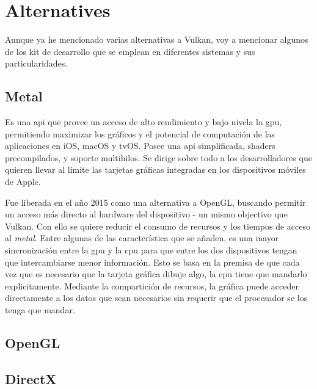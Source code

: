 \chapter{Alternatives}
Aunque ya he mencionado varias alternativas a Vulkan, voy a mencionar algunos de los kit de desarrollo que se emplean
en diferentes sistemas y sus particularidades.

\section{Metal}
Es una \gls{api} que provee un acceso de alto rendimiento y bajo nivela la \gls{gpu}, permitiendo maximizar los
gráficos y el potencial de computación de las aplicaciones en iOS, macOS y tvOS. Posee una \gls{api} simplificada,
shaders precompilados, y soporte multihilos. Se dirige sobre todo a los desarrolladores que quieren llevar al límite
las tarjetas gráficas integradas en los dispositivos móviles de Apple.

Fue liberada en el año 2015 como una alternativa a OpenGL, buscando permitir un acceso más directo al hardware del
dispositivo - un mismo objectivo que Vulkan. Con ello se quiere reducir el consumo de recursos y los tiempos de
acceso al \emph{metal}. Entre algunas de las característica que se añaden, es una mayor sincronización entre la
\gls{gpu} y la \gls{cpu} para que entre los dos dispositivos tengan que intercambiarse menor información. Esto se basa
en la premisa de que cada vez que es necesario que la tarjeta gráfica dibuje algo, la \gls{cpu} tiene que mandarlo
explicitamente. Mediante la compartición de recursos, la gráfica puede acceder directamente a los datos que sean
necesarios sin requerir que el procesador se los tenga que mandar.

\section{OpenGL}

\section{DirectX}
